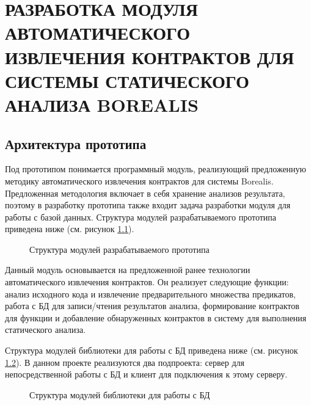 \chapter{РАЗРАБОТКА МОДУЛЯ АВТОМАТИЧЕСКОГО ИЗВЛЕЧЕНИЯ КОНТРАКТОВ ДЛЯ СИСТЕМЫ СТАТИЧЕСКОГО АНАЛИЗА BOREALIS}
\label{chapter:developing}

\section{Архитектура прототипа}
Под прототипом понимается программный модуль, реализующий предложенную методику автоматического извлечения контрактов для системы Borealis. Предложенная методология включает в себя хранение анализов результата, поэтому в разработку прототипа  также входит задача разработки модуля для работы с базой данных. Структура модулей разрабатываемого прототипа приведена ниже (см. рисунок \ref{image:borealisStructure}).
\begin{figure}[h!]
\caption{Структура модулей разрабатываемого прототипа}
\label{image:borealisStructure}
\end{figure}

Данный модуль основывается на предложенной ранее технологии автоматического извлечения контрактов. Он реализует следующие функции: анализ исходного кода и извлечение предварительного множества предикатов, работа с БД для записи/чтения результатов анализа, формирование контрактов для функции и добавление обнаруженных контрактов в систему для выполнения статического анализа.

Структура модулей библиотеки для работы с БД приведена ниже (см. рисунок \ref{image:leveldbStructure}). В данном проекте реализуются два подпроекта: сервер для непосредственной работы с БД и клиент для подключения к этому серверу.
\begin{figure}[h!]
\caption{Структура модулей библиотеки для работы с БД}
\label{image:leveldbStructure}
\end{figure}

